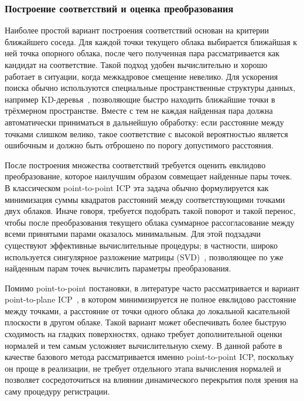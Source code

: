 \subsubsection{Построение соответствий и оценка преобразования}

Наиболее простой вариант построения соответствий основан на критерии ближайшего соседа. Для каждой точки текущего облака выбирается ближайшая к ней точка опорного облака, после чего полученная пара рассматривается как кандидат на соответствие. Такой подход удобен вычислительно и хорошо работает в ситуации, когда межкадровое смещение невелико. Для ускорения поиска обычно используются специальные пространственные структуры данных, например KD-деревья~\cite{kd-tree-habr}, позволяющие быстро находить ближайшие точки в трёхмерном пространстве. Вместе с тем не каждая найденная пара должна автоматически приниматься в дальнейшую обработку: если расстояние между точками слишком велико, такое соответствие с высокой вероятностью является ошибочным и должно быть отброшено по порогу допустимого расстояния.

После построения множества соответствий требуется оценить евклидово преобразование, которое наилучшим образом совмещает найденные пары точек. В классическом point-to-point ICP эта задача обычно формулируется как минимизация суммы квадратов расстояний между соответствующими точками двух облаков. Иначе говоря, требуется подобрать такой поворот и такой перенос, чтобы после преобразования текущего облака суммарное рассогласование между всеми принятыми парами оказалось минимальным. Для этой подзадачи существуют эффективные вычислительные процедуры; в частности, широко используется сингулярное разложение матрицы (SVD)~\cite{svd-yandex-handbook}, позволяющее по уже найденным парам точек вычислить параметры преобразования.

Помимо point-to-point постановки, в литературе часто рассматривается и вариант point-to-plane ICP~\cite{point-cloud-registration-survey-huang}, в котором минимизируется не полное евклидово расстояние между точками, а расстояние от точки одного облака до локальной касательной плоскости в другом облаке. Такой вариант может обеспечивать более быструю сходимость на гладких поверхностях, однако требует дополнительной оценки нормалей и тем самым усложняет вычислительную схему. В данной работе в качестве базового метода рассматривается именно point-to-point ICP, поскольку он проще в реализации, не требует отдельного этапа вычисления нормалей и позволяет сосредоточиться на влиянии динамического перекрытия поля зрения на саму процедуру регистрации.

